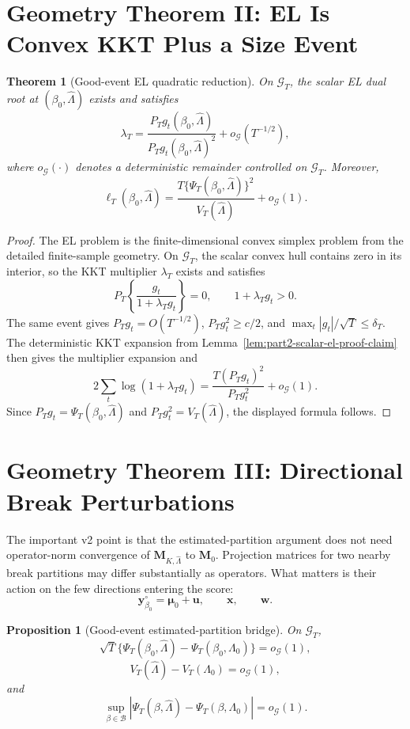 \documentclass[12pt]{article}
\numberwithin{equation}{section}
\newtheorem{theorem}{Theorem}
\newtheorem{proposition}{Proposition}
\theoremstyle{definition}
\begin{document}
\section{Geometry Theorem II: EL Is Convex KKT Plus a Size Event}

\begin{theorem}[Good-event EL quadratic reduction]
\label{thm:v2-good-event-el}
On \(\mathcal G_T\), the scalar EL dual root at
\((\beta_0,\widehat\Lambda)\) exists and satisfies
\[
    \lambda_T
    =\frac{P_Tg_t(\beta_0,\widehat\Lambda)}
           {P_Tg_t(\beta_0,\widehat\Lambda)^2}
      +o_{\mathcal G}(T^{-1/2}),
\]
where \(o_{\mathcal G}(\cdot)\) denotes a deterministic remainder controlled on
\(\mathcal G_T\). Moreover,
\[
    \ell_T(\beta_0,
    \widehat\Lambda)
    =\frac{T\{\Psi_T(\beta_0,\widehat\Lambda)\}^2}
           {V_T(\widehat\Lambda)}+o_{\mathcal G}(1).
\]
\end{theorem}

\begin{proof}
The EL problem is the finite-dimensional convex simplex problem from the detailed finite-sample geometry.
On \(\mathcal G_T\), the scalar convex hull contains zero in its interior, so the
KKT multiplier \(\lambda_T\) exists and satisfies
\[
    P_T\left\{\frac{g_t}{1+\lambda_Tg_t}\right\}=0,
    \qquad 1+\lambda_Tg_t>0.
\]
The same event gives \(P_Tg_t=O(T^{-1/2})\),
\(P_Tg_t^2\ge c/2\), and \(\max_t|g_t|/\sqrt T\le\delta_T\). The deterministic
KKT expansion from Lemma~\ref{lem:part2-scalar-el-proof-claim} then gives the
multiplier expansion and
\[
    2\sum_t\log(1+\lambda_Tg_t)
    =\frac{T(P_Tg_t)^2}{P_Tg_t^2}+o_{\mathcal G}(1).
\]
Since \(P_Tg_t=\Psi_T(\beta_0,\widehat\Lambda)\) and
\(P_Tg_t^2=V_T(\widehat\Lambda)\), the displayed formula follows.
\end{proof}

\section{Geometry Theorem III: Directional Break Perturbations}

The important v2 point is that the estimated-partition argument does not need
operator-norm convergence of \(\bm M_{K,\widehat\Lambda}\) to \(\bm M_0\).
Projection matrices for two nearby break partitions may differ substantially as
operators. What matters is their action on the few directions entering the
score:
\[
    \bm y_{\beta_0}^\circ=\bm\mu_0+\bm u,
    \qquad \bm x,
    \qquad \bm w.
\]

\begin{proposition}[Good-event estimated-partition bridge]
\label{prop:v2-good-event-break-bridge}
On \(\mathcal G_T\),
\[
    \sqrt T\{\Psi_T(\beta_0,\widehat\Lambda)
      -\Psi_T(\beta_0,\Lambda_0)\}=o_{\mathcal G}(1),
\]
\[
    V_T(\widehat\Lambda)-V_T(\Lambda_0)=o_{\mathcal G}(1),
\]
and
\[
    \sup_{\beta\in\mathcal B}
    |\Psi_T(\beta,\widehat\Lambda)-\Psi_T(\beta,\Lambda_0)|=o_{\mathcal G}(1).
\]
\end{proposition}
\end{document}
